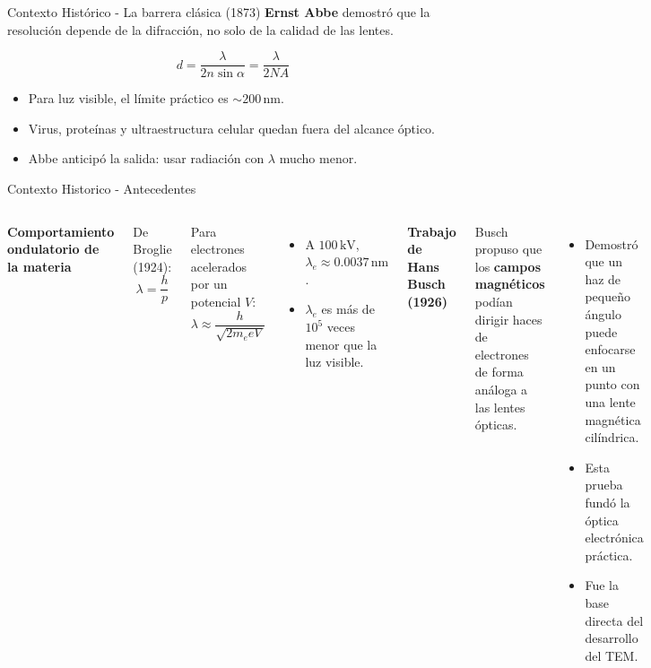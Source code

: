 \begin{frame}{Contexto Histórico - La barrera clásica (1873)}
\textbf{Ernst Abbe} demostró que la resolución depende de la difracción, no solo de la calidad de las lentes.

\vspace{0.6em}
\[
  d = \frac{\lambda}{2n\sin\alpha} = \frac{\lambda}{2NA}
\]

\begin{itemize}
  \item Para luz visible, el límite práctico es \(\sim 200\,\text{nm}\).
  \item Virus, proteínas y ultraestructura celular quedan fuera del alcance óptico.
  \item Abbe anticipó la salida: usar radiación con \(\lambda\) mucho menor.
\end{itemize}
\end{frame}

\begin{frame}{Contexto Historico - Antecedentes}
\begin{columns}[T,totalwidth=\textwidth]
\textbf{Comportamiento ondulatorio de la materia}

\vspace{0.4em}
De Broglie (1924):
\[
\lambda = \frac{h}{p}
\]

Para electrones acelerados por un potencial \(V\):
\[
\lambda \approx \frac{h}{\sqrt{2m_e eV}}
\]

\begin{itemize}
  \item A \(100\,\text{kV}\), \(\lambda_e \approx 0.0037\,\text{nm}\).
  \item \(\lambda_e\) es más de \(10^5\) veces menor que la luz visible.
\end{itemize}

\textbf{Trabajo de Hans Busch (1926)}

\vspace{0.4em}
Busch propuso que los \textbf{campos magnéticos} podían dirigir haces de electrones de forma análoga a las lentes ópticas.

\begin{itemize}
  \item Demostró que un haz de pequeño ángulo puede enfocarse en un punto con una lente magnética cilíndrica.
  \item Esta prueba fundó la óptica electrónica práctica.
  \item Fue la base directa del desarrollo del TEM.
\end{itemize}
\end{columns}
\end{frame}

